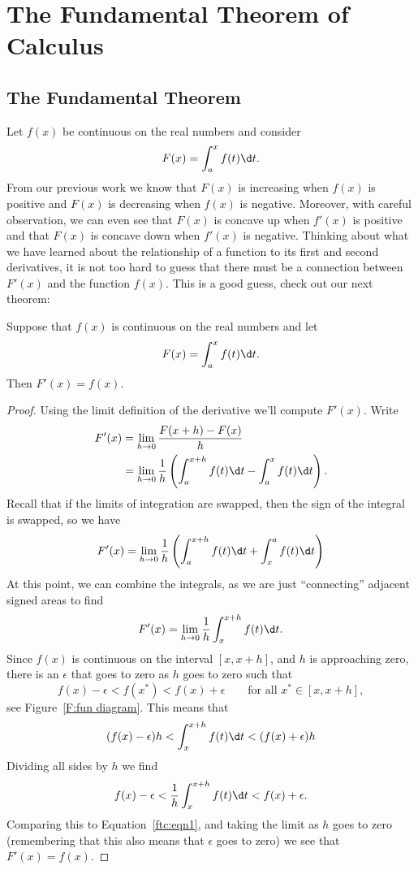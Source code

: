 \chapter{The Fundamental Theorem of Calculus}

\section{The Fundamental Theorem}

Let $f(x)$ be continuous on the real numbers and consider
\[
  F(x) = \int_a^x f(t)\d t.
\]
From our previous work we know that $F(x)$ is increasing when $f(x)$
is positive and $F(x)$ is decreasing when $f(x)$ is negative. Moreover,
with careful observation, we can even see that $F(x)$ is concave up
when $f'(x)$ is positive and that $F(x)$ is concave down when $f'(x)$
is negative. Thinking about what we have learned about the
relationship of a function to its first and second derivatives, it is
not too hard to guess that there must be a connection between $F'(x)$
and the function $f(x)$. This is a good guess, check out our next
theorem:


\begin{mainTheorem}
\label{thm:fundamental_theorem_I}\hfil

\noindent Suppose that $f(x)$ is continuous on the real numbers and let
\[
  F(x)=\int_a^x f(t)\d t.
\]
Then $F'(x)=f(x)$.
\end{mainTheorem}

\begin{proof}
Using the limit definition of the derivative we'll compute $F'(x)$.
Write
\begin{align*}
F'(x) &= \lim_{h\to 0}\frac{F(x+h)-F(x)}{h}\\ 
&=\lim_{h\to 0}\frac{1}{h}\left( \int_a^{x+h} f(t)\d t - \int_a^x f(t)\d t\right).
\end{align*}
Recall that if the limits of integration are swapped, then the sign
of the integral is swapped, so we have
\[
F'(x) =\lim_{h\to 0} \frac{1}{h}\left( \int_a^{x+h} f(t)\d t + \int_x^a f(t)\d t\right)
\]
At this point, we can combine the integrals, as we are just ``connecting'' adjacent signed areas to find
\begin{equation}\label{ftc:eqn1}
F'(x)=\lim_{h\to 0} \frac{1}{h}\int_x^{x+h} f(t)\d t.
\end{equation}
Since $f(x)$ is continuous on the interval $[x,x+h]$, and $h$ is
approaching zero, there is an $\epsilon$ that goes to zero as $h$ goes
to zero such that
\[
f(x)-\epsilon < f(x^*) < f(x) + \epsilon \qquad \text{for all }x^*\in[x,x+h],
\]
see Figure~\ref{F:fun diagram}. This means that 
\[
(f(x) - \epsilon)h < \int_x^{x+h} f(t)\d t < (f(x) + \epsilon)h
\]
Dividing all sides by $h$ we find
\[
f(x) - \epsilon < \frac{1}{h}\int_x^{x+h} f(t)\d t < f(x) + \epsilon.
\]
Comparing this to Equation~\ref{ftc:eqn1}, and taking the limit as $h$
goes to zero (remembering that this also means that $\epsilon$ goes to
zero) we see that $F'(x) = f(x)$.
\end{proof}

